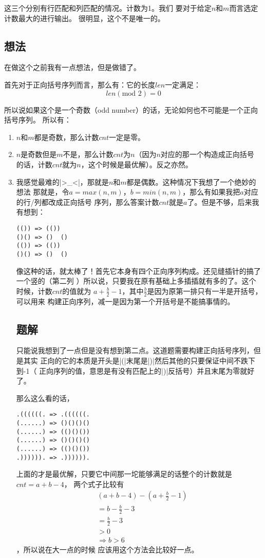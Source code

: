 这三个分别有行匹配和列匹配的情况。计数为1。我们
要对于给定$n$和$m$而言选定计数最大的进行输出。
很明显，这个不是唯一的。

\subsection{想法}

在做这个之前我有一点想法，但是做错了。

首先对于正向括号序列而言，那么有：它的长度$len$一定满足：%
$$len (\text{mod } 2) = 0$$

所以说如果这个是一个奇数（odd number）的话，无论如何也不可能是一个正向括号序列。
所以有：

\begin{enumerate}
\item $n$和$m$都是奇数，那么计数$cnt$一定是零。
\item $n$是奇数但是$m$不是，那么计数$cnt$为$n$（因为$n$对应的那一个构造成正向括号
的话，计数$cnt$就为$n$，这个时候是最优解）。反之亦然。
\item 我感觉最难的\vb|>_<|，那就是$n$和$m$都是偶数。这种情况下我想了一个绝妙的想法
那就是，令$a=max(n, m)$，$b=min(n,m)$，那么有如果我把$a$对应的行/列都改成正向括号
序列，那么答案计数$cnt$就是$a$了。但是不够，后来我有想到：
\begin{lstlisting}
(()) => (())
()() => ()  ()
(()) => (())
()() => ()  ()
\end{lstlisting}

像这种的话，就太棒了！首先它本身有四个正向序列构成。还见缝插针的搞了一个竖的（第二列
）所以说，只要我在原有基础上多插插就有多的了。这个时候，计数$cnt$的值就为%
$a+\frac{b}{2}-1$，其中$\frac{b}{2}$是因为原第一排只有一半是开括号，可以用来
构建正向序列，减一是因为第一个开括号是不能搞事情的。

\subsection{题解}

只能说我想到了一点但是没有想到第二点。这道题需要构建正向括号序列，但是其实
正向的它的本质是开头是\vb|(|末尾是\vb|)|然后其他的只要保证中间不跌下到-1（
正向序列的值，意思是有没有匹配上的\vb|)|反括号）并且末尾为零就好了。

那么这么看的话，
\begin{lstlisting}
.((((((. => .((((((.
(......) => ()()()()
(......) => (()()())
(......) => ()()()()
(......) => (()()())
.)))))). => .)))))).
\end{lstlisting}

上面的才是最优解，只要它中间那一坨能够满足的话整个的计数就是$cnt=a+b-4$，
两个式子比较有\begin{align}&(a+b-4)-(a+\frac{b}{2}-1)\\&=b-\frac{b}{2}-3\\
&=\frac{b}{2}-3\\&>0\\&\Longrightarrow b>6\end{align}，所以说在大一点的时候
应该用这个方法会比较好一点。

\end{enumerate}
